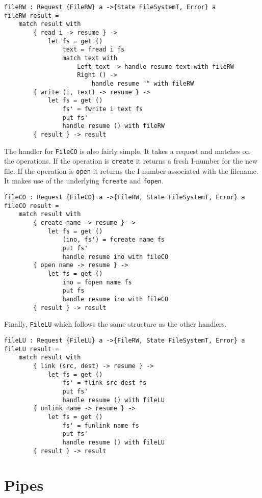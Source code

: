 \documentclass[logo,bsc,singlespacing,parskip]{infthesis}
\begin{document}
\begin{lstlisting}[language=unison]
fileRW : Request {FileRW} a ->{State FileSystemT, Error} a
fileRW result =
    match result with
        { read i -> resume } ->
            let fs = get ()
                text = fread i fs
                match text with
                    Left text -> handle resume text with fileRW
                    Right () -> 
                        handle resume "" with fileRW
        { write (i, text) -> resume } ->
            let fs = get ()
                fs' = fwrite i text fs
                put fs'
                handle resume () with fileRW
        { result } -> result
\end{lstlisting}

The handler for \texttt{FileCO} is also fairly simple. It takes a request and
matches on the operations. If the operation is \texttt{create} it returns a
fresh I-number for the new file. If the operation is \texttt{open} it returns
the I-number associated with the filename. It makes use of the underlying
\texttt{fcreate} and \texttt{fopen}.

\begin{lstlisting}[language=unison]
fileCO : Request {FileCO} a ->{FileRW, State FileSystemT, Error} a
fileCO result =
    match result with
        { create name -> resume } ->
            let fs = get ()
                (ino, fs') = fcreate name fs
                put fs'
                handle resume ino with fileCO
        { open name -> resume } ->
            let fs = get ()
                ino = fopen name fs
                put fs
                handle resume ino with fileCO
        { result } -> result
\end{lstlisting}

Finally, \texttt{FileLU} which follows the same structure as the other handlers.

\begin{lstlisting}[language=unison]
fileLU : Request {FileLU} a ->{FileRW, State FileSystemT, Error} a
fileLU result =
    match result with
        { link (src, dest) -> resume } ->
            let fs = get ()
                fs' = flink src dest fs
                put fs'
                handle resume () with fileLU
        { unlink name -> resume } ->
            let fs = get ()
                fs' = funlink name fs
                put fs'
                handle resume () with fileLU
        { result } -> result
\end{lstlisting}

\section{Pipes}
\end{document}
